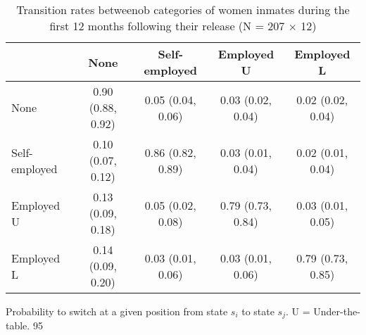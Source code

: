 \begin{table}[htp]
\footnotesize
\setlength{\tabcolsep}{10pt}
\renewcommand{\arraystretch}{1.3}
\begin{threeparttable}
\centering
\caption{Transition rates betweenob categories of women inmates \newline
    during the first 12 months following their release (N = 207 $\times$ 12)} 
\label{tab:transition_rates_job}
\begin{tabular}{lcccc}
  \hline
 & None & Self-employed & Employed U & Employed L \\ 
  \hline
None & 0.90 (0.88, 0.92) & 0.05 (0.04, 0.06) & 0.03 (0.02, 0.04) & 0.02 (0.02, 0.04) \\ 
  Self-employed & 0.10 (0.07, 0.12) & 0.86 (0.82, 0.89) & 0.03 (0.01, 0.04) & 0.02 (0.01, 0.04) \\ 
  Employed U & 0.13 (0.09, 0.18) & 0.05 (0.02, 0.08) & 0.79 (0.73, 0.84) & 0.03 (0.01, 0.05) \\ 
  Employed L & 0.14 (0.09, 0.20) & 0.03 (0.01, 0.06) & 0.03 (0.01, 0.06) & 0.79 (0.73, 0.85) \\ 
   \hline
\end{tabular}
\begin{tablenotes}
\scriptsize
\item Probability to switch at a given position from state $s_i$ to state $s_j$. U = Under-the-table.
95%
\end{tablenotes}
\end{threeparttable}
\end{table}

